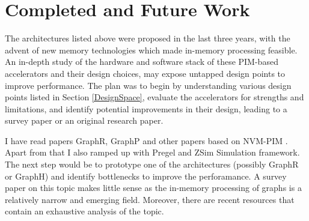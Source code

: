 \section{Completed and Future Work}

The architectures listed above were proposed in the last three years, with the advent of new memory technologies which made in-memory processing feasible. An in-depth study of the hardware and software stack of these PIM-based accelerators and their design choices, may expose untapped design points to improve performance. The plan was to begin by understanding various design points listed in Section \ref{DesignSpace}, evaluate the accelerators for strengths and limitations, and identify potential improvements in their design, leading to a survey paper or an original research paper.

I have read papers GraphR\cite{GraphR}, GraphP\cite{GraphP} and other papers based on NVM-PIM \cite{k-means}. Apart from that I also ramped up with Pregel and ZSim Simulation framework. The next step would be to prototype one of the architectures (possibly GraphR or GraphH) and identify bottlenecks to improve the perforamance. A survey paper on this topic makes little sense as the in-memory processing of graphs is a relatively narrow and emerging field. Moreover, there are recent resources \cite{BGA-book, SG-MT} that contain an exhaustive analysis of the topic.
